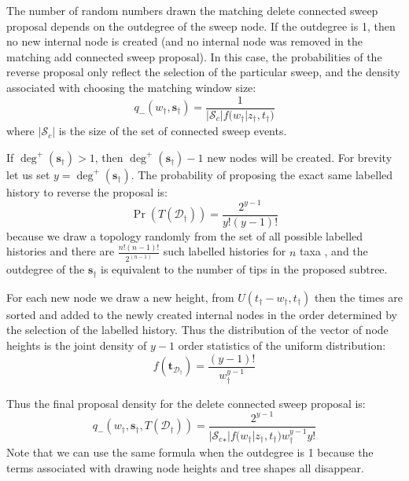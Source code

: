 \documentclass[letterpaper]{article}
\newcommand{\sweep}[1]{{\ensuremath{\mathbf{s}_{#1}}}}
\newcommand{\sweeptime}[1]{{\ensuremath{t_{#1}}}}
\newcommand{\sweeploc}[1]{{\ensuremath{z_{#1}}}}
\newcommand{\connectedSweepSet}{{\ensuremath{\mathcal{S}_c}}}
\newcommand{\outdegree}[1]{{\ensuremath{\deg^{+}\left(#1\right)}}}
\begin{document}
The number of random numbers drawn the matching delete connected sweep proposal depends on the outdegree of the sweep node.
If the outdegree is 1, then no new internal node is created (and no internal node was removed in the matching add connected sweep proposal).
In this case, the probabilities of the reverse proposal only reflect the selection of the particular sweep, and the density associated with choosing the matching window size:
\begin{equation}
	q_{-}(w_{\dag},\sweep{\dag}) =\frac{1}{|\connectedSweepSet|f\Big(w_{\dag}\Big|\sweeploc{\dag},\sweeptime{\dag}\Big)}
\end{equation}
where $|\connectedSweepSet|$ is the size of the set of connected sweep events.

If $\outdegree{\sweep{\dag}} > 1$, then $\outdegree{\sweep{\dag}}-1$ new nodes will be created.
For brevity let us set $y=\outdegree{\sweep{\dag}}$.
The probability of proposing the exact same labelled history to reverse the proposal is:
\begin{equation}
	\Pr(T(\mathcal{D}_{\dag})) = \frac{2^{y-1}}{y!(y-1)!}
\end{equation}
because we draw a topology randomly from the set of all possible labelled histories and there are $\frac{n!(n-1)!}{2^{(n-1)}}$ such labelled histories for $n$ taxa \citep{Edwards1970}, and the outdegree of the $\sweep{\dag}$ is equivalent to the number of tips in the proposed subtree.

For each new node we draw a new height, from $U(\sweeptime{\dag}-w_{\dag}, \sweeptime{\dag})$ then the times are sorted and added to the newly created internal nodes in the order determined by the selection of the labelled history.
Thus the distribution of the vector of node heights is the joint density of $y-1$ order statistics of the uniform distribution:
\begin{equation}
	f({\mathbf{t}}_{\mathcal{D}_{\dag}}) = \frac{(y-1)!}{w_{\dag}^{y-1}}
\end{equation}

Thus the final proposal density for the delete connected sweep proposal is:
\begin{equation}
	q_{-}(w_{\dag},\sweep{\dag}, T(\mathcal{D}_{\dag})) =\frac{2^{y-1}}{| \connectedSweepSet_* |f\Big(w_{\dag}\Big|\sweeploc{\dag},\sweeptime{\dag}\Big)w_{\dag}^{y-1}y!}
\end{equation}
Note that we can use the same formula when the outdegree is 1 because the terms associated with drawing node heights and tree shapes all disappear.
\end{document}
